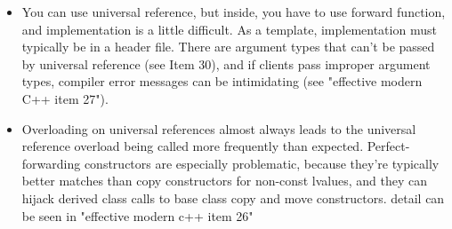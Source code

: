 \documentclass[a4paper,11pt,twoside]{book}
\begin{document}
\begin{itemize}
    \item You can use universal reference,  but inside, you have to use forward function, and implementation is a little difficult. As a template, implementation must typically be in a header file. There are argument types that can't be passed by universal reference (see Item 30), and if clients pass improper argument types, compiler error messages can be intimidating (see "effective modern C++ item 27").

    \item Overloading on universal references almost always leads to the universal reference overload being called more frequently than expected. Perfect-forwarding constructors are especially problematic, because they're typically better matches than copy constructors for non-const lvalues, and they can hijack derived class calls to base class copy and move constructors. detail can be seen in "effective modern c++ item 26"

\end{itemize}
\end{document}
